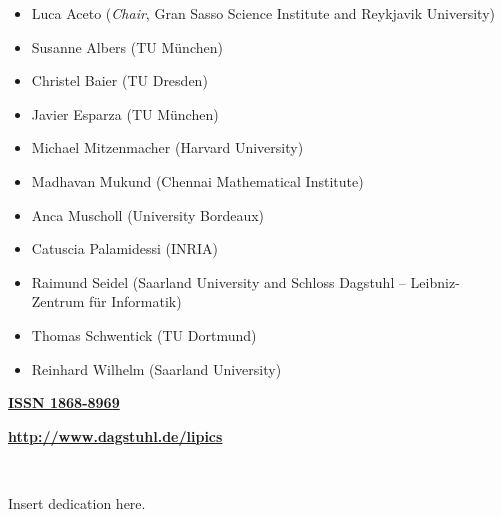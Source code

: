 \documentclass[a4paper,UKenglish]{lipicsmaster-v2018}
\begin{document}
\begin{publicationinfo}
\begin{itemize} 
\item Luca Aceto (\emph{Chair}, Gran Sasso Science Institute and Reykjavik University) 
\item Susanne Albers (TU M\"unchen)
\item Christel Baier (TU Dresden)
\item Javier Esparza (TU M\"unchen)
\item Michael Mitzenmacher (Harvard University)
\item Madhavan Mukund (Chennai Mathematical Institute)
\item Anca Muscholl (University Bordeaux)
\item Catuscia Palamidessi (INRIA)
\item Raimund Seidel (Saarland University and Schloss Dagstuhl -- Leibniz-Zentrum f\"ur Informatik)
\item Thomas Schwentick (TU Dortmund)
\item Reinhard Wilhelm (Saarland University)
\end{itemize}
 
\bigskip
\bigskip
\bigskip

{\large\bf\sffamily \href{http://www.dagstuhl.de/dagpub/1868-8969}{ISSN 1868-8969}}

\bigskip
\bigskip
\bigskip

{\Large\bf\sffamily \href{http://www.dagstuhl.de/lipics}{http://www.dagstuhl.de/lipics}}
 
\vfill

 
\newpage
 
\thispagestyle{empty}

\ \\

\end{publicationinfo}


\begin{dedication}%
  Insert dedication here.
\end{dedication}
\end{document}
